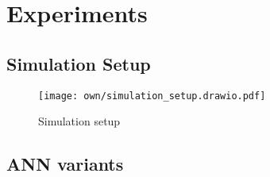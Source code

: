 \chapter{Experiments}
\label{maintwo}

\section{Simulation Setup}



\begin{figure}
    \centering
    \texttt{[image: own/simulation\_setup.drawio.pdf]}
    \caption[
        Simulation setup
    ]{
        Simulation setup
    }
\end{figure}








\section{ANN variants}







\section{}